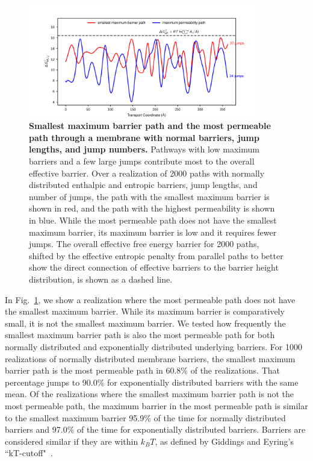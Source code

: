 \documentclass[12pt]{article}
\begin{document}
\begin{figure}[ht!]
    \includegraphics[width=0.9\textwidth]{figures/fig5.pdf}
    \caption{\textbf{Smallest maximum barrier path and the most permeable path through a membrane with normal barriers, jump lengths, and jump numbers.} Pathways with low maximum barriers and a few large jumps contribute most to the overall effective barrier. Over a realization of 2000 paths with normally distributed enthalpic and entropic barriers, jump lengths, and number of jumps, the path with the smallest maximum barrier is shown in red, and the path with the highest permeability is shown in blue. While the most permeable path does not have the smallest maximum barrier, its maximum barrier is low and it requires fewer jumps. The overall effective free energy barrier for 2000 paths, shifted by the effective entropic penalty from parallel paths to better show the direct connection of effective barriers to the barrier height distribution, is shown as a dashed line.}
    \label{fig:vary_everything}
\end{figure}

In Fig.~\ref{fig:vary_everything}, we show a realization where the most permeable path does not have the smallest maximum barrier. While its maximum barrier is comparatively small, it is not the smallest maximum barrier. We tested how frequently the smallest maximum barrier path is also the most permeable path for both normally distributed and exponentially distributed underlying barriers. For 1000 realizations of normally distributed membrane barriers, the smallest maximum barrier path is the most permeable path in 60.8\% of the realizations. That percentage jumps to 90.0\% for exponentially distributed barriers with the same mean. Of the realizations where the smallest maximum barrier path is not the most permeable path, the maximum barrier in the most permeable path is similar to the smallest maximum barrier 95.9\% of the time for normally distributed barriers and 97.0\% of the time for exponentially distributed barriers. Barriers are considered similar if they are within $k_B T$, as defined by Giddings and Eyring's ``kT-cutoff"~\cite{giddings_multi-barrier_1958}.
\end{document}
